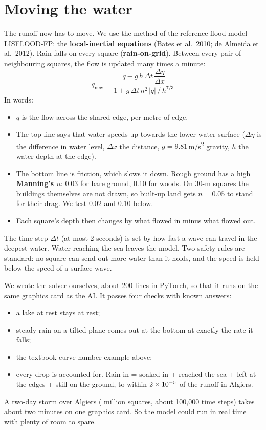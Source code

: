 \section{Moving the water}
\label{sec:p5_solver}
The runoff now has to move. We use the method of the reference flood model LISFLOOD-FP: the \textbf{local-inertial
equations} (Bates et al.\ 2010; de Almeida et al.\ 2012). Rain falls on every square (\textbf{rain-on-grid}). Between
every pair of neighbouring squares, the flow is updated many times a minute:
\begin{equation}
q_{\text{new}} = \frac{q - g\,h\,\Delta t\,\dfrac{\Delta\eta}{\Delta x}}{1 + g\,\Delta t\,n^2\,|q|\,/\,h^{7/3}}
\end{equation}
In words:
\begin{itemize}
\item $q$ is the flow across the shared edge, per metre of edge.
\item The top line says that water speeds up towards the lower water surface ($\Delta\eta$ is the difference in water
level, $\Delta x$ the distance, $g = 9.81$\,m/s\textsuperscript{2} gravity, $h$ the water depth at the edge).
\item The bottom line is friction, which slows it down. Rough ground has a high \textbf{Manning's $n$}: 0.03 for bare
ground, 0.10 for woods. On 30-m squares the buildings themselves are not drawn, so built-up land gets $n = 0.05$ to stand
for their drag. We test 0.02 and 0.10 below.
\item Each square's depth then changes by what flowed in minus what flowed out.
\end{itemize}
The time step $\Delta t$ (at most 2 seconds) is set by how fast a wave can travel in the deepest water. Water reaching the
sea leaves the model. Two safety rules are standard: no square can send out more water than it holds, and the speed is
held below the speed of a surface wave.

We wrote the solver ourselves, about 200 lines in PyTorch, so that it runs on the same graphics card as the AI. It
passes four checks with known answers:
\begin{itemize}
\item a lake at rest stays at rest;
\item steady rain on a tilted plane comes out at the bottom at exactly the rate it falls;
\item the textbook curve-number example above;
\item every drop is accounted for. Rain in = soaked in + reached the sea + left at the edges + still on the ground, to
within $2\times10^{-5}$ of the runoff in Algiers.
\end{itemize}
A two-day storm over Algiers (\PfiveAlgCells{} million squares, about 100{,}000 time steps) takes about two minutes on one
graphics card. So the model could run in real time with plenty of room to spare.

